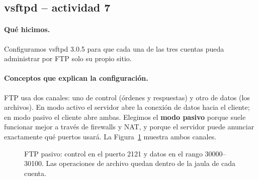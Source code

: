 \documentclass[11pt,a4paper]{article}
\begin{document}
\subsection{vsftpd -- actividad 7}
\paragraph{Qué hicimos.} Configuramos vsftpd 3.0.5 para que cada una de las tres cuentas pueda administrar por FTP solo su propio sitio.

\paragraph{Conceptos que explican la configuración.} FTP usa dos canales: uno de control (órdenes y respuestas) y otro de datos (los archivos). En modo activo el servidor abre la conexión de datos hacia el cliente; en modo pasivo el cliente abre ambas. Elegimos el \textbf{modo pasivo} porque suele funcionar mejor a través de firewalls y NAT, y porque el servidor puede anunciar exactamente qué puertos usará. La Figura~\ref{fig:ftp-pasivo} muestra ambos canales.
\begin{figure}[htbp]\centering
{}
\caption[Canales FTP en modo pasivo]{FTP pasivo: control en el puerto 2121 y datos en el rango 30000--30100. Las operaciones de archivo quedan dentro de la jaula de cada cuenta.}\label{fig:ftp-pasivo}
\end{figure}
\end{document}

